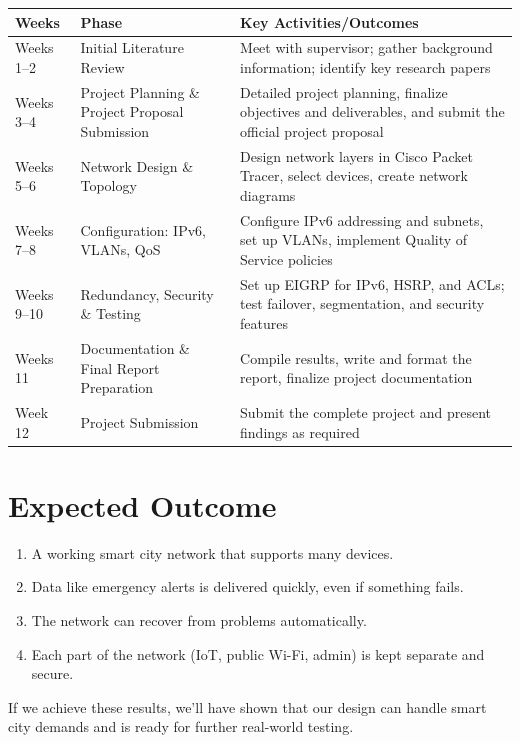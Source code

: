 \documentclass[12pt,a4paper]{article}
\begin{document}
\begin{center}
\begin{tabularx}{\textwidth}{
    |>{\raggedright\arraybackslash}p{2.4cm}
    |>{\raggedright\arraybackslash}p{4.2cm}
    |>{\raggedright\arraybackslash}X|
}
\hline
\textbf{Weeks} & \textbf{Phase} & \textbf{Key Activities/Outcomes} \\
\hline
Weeks 1--2 & Initial Literature Review & Meet with supervisor; gather background information; identify key research papers \\
\hline
Weeks 3--4 & Project Planning \& Project Proposal Submission & Detailed project planning, finalize objectives and deliverables, and submit the official project proposal \\
\hline
Weeks 5--6 & Network Design \& Topology & Design network layers in Cisco Packet Tracer, select devices, create network diagrams \\
\hline
Weeks 7--8 & Configuration: IPv6, VLANs, QoS & Configure IPv6 addressing and subnets, set up VLANs, implement Quality of Service policies \\
\hline
Weeks 9--10 & Redundancy, Security \& Testing & Set up EIGRP for IPv6, HSRP, and ACLs; test failover, segmentation, and security features \\
\hline
Weeks 11 & Documentation \& Final Report Preparation & Compile results, write and format the report, finalize project documentation \\
\hline
Week 12 & Project Submission & Submit the complete project and present findings as required \\
\hline
\end{tabularx}
\end{center}






\section*{Expected Outcome}
\begin{enumerate}[label=7.\arabic*, nosep]
    \item A working smart city network that supports many devices.
    \item Data like emergency alerts is delivered quickly, even if something fails.
    \item The network can recover from problems automatically.
    \item Each part of the network (IoT, public Wi-Fi, admin) is kept separate and secure.
\end{enumerate}
If we achieve these results, we’ll have shown that our design can handle smart city demands and is ready for further real-world testing.
\end{document}
